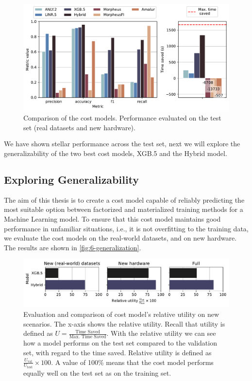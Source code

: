 \begin{figure}[ht]
  \centering
  \includegraphics[width=\linewidth]{chapters/06_evaluation/figures/eval_sota_results.pdf}
  \caption[Cost model comparison vs. SOTA]{Comparison of the cost models. Performance evaluated on the test set (real datasets and new hardware).}
  \label{fig:6-sota-comparison}
\end{figure}

We have shown stellar performance across the test set, next we will explore the generalizability of the two best cost models, XGB.5 and the Hybrid model.

\subsection{Exploring Generalizability}
\label{subsec:6-generalizability}
The aim of this thesis is to create a cost model capable of reliably predicting the most suitable option between factorized and materialized training methods for a Machine Learning model. To ensure that this cost model maintains good performance in unfamiliar situations, i.e., it is not overfitting to the training data, we evaluate the cost models on the real-world datasets, and on new hardware. The results are shown in \autoref{fig:6-generalization}.

\begin{figure}
  \centering
  \includegraphics[width=\linewidth]{chapters/06_evaluation/figures/eval_generalization.pdf}
  \caption[Evaluation of utility on new scenarios]{Evaluation and comparison of cost model's relative utility on new scenarios. The x-axis shows the relative utility. Recall that utility is defined as $U=\frac{\text{Time Saved}}{\text{Max. Time Saved}}$. With the relative utility we can see how a model performs on the test set compared to the validation set, with regard to the time saved. Relative utility is defined as $\frac{U_{\text{val}}}{U_{\text{test}}} \times 100$. A value of 100\% means that the cost model performs equally well on the test set as on the training set.}
  \label{fig:6-generalization}
\end{figure}

